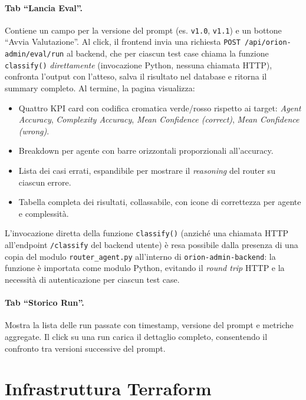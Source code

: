 \paragraph{Tab ``Lancia Eval''.} Contiene un campo per la versione del prompt (es. \texttt{v1.0}, \texttt{v1.1}) 
e un bottone ``Avvia Valutazione''. Al click, il frontend invia una richiesta \texttt{POST /api/orion-admin/eval/run} al backend, 
che per ciascun test case chiama la funzione \texttt{classify()} \emph{direttamente} (invocazione Python, nessuna chiamata HTTP), 
confronta l'output con l'atteso, salva il risultato nel database e ritorna il summary completo. Al termine, la pagina visualizza:

\begin{itemize}
  \item Quattro KPI card con codifica cromatica verde/rosso rispetto ai target: \emph{Agent Accuracy}, \emph{Complexity Accuracy}, \emph{Mean Confidence (correct)}, \emph{Mean Confidence (wrong)}.
  \item Breakdown per agente con barre orizzontali proporzionali all'accuracy.
  \item Lista dei casi errati, espandibile per mostrare il \emph{reasoning} del router su ciascun errore.
  \item Tabella completa dei risultati, collassabile, con icone di correttezza per agente e complessità.
\end{itemize}

L'invocazione diretta della funzione \texttt{classify()} (anziché una chiamata HTTP
all'endpoint \texttt{/classify} del backend utente) è resa possibile dalla presenza di
una copia del modulo \texttt{router\_agent.py} all'interno di \texttt{orion-admin-backend}:
la funzione è importata come modulo Python, evitando il \emph{round trip} HTTP e la
necessità di autenticazione per ciascun test case.

\paragraph{Tab ``Storico Run''.} Mostra la lista delle run passate con timestamp, versione del prompt e metriche aggregate. 
Il click su una run carica il dettaglio completo, consentendo il confronto tra versioni successive del prompt.

\section{Infrastruttura Terraform}
\label{sec:orion-impl-iac}


